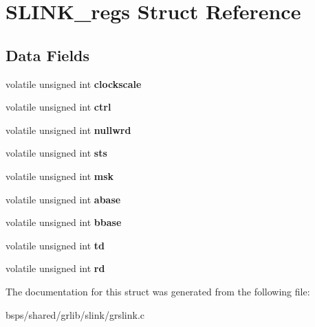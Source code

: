 \hypertarget{structSLINK__regs}{}\section{S\+L\+I\+N\+K\+\_\+regs Struct Reference}
\label{structSLINK__regs}
\subsection*{Data Fields}
\begin{DoxyCompactItemize}
\item 
\mbox{\label{structSLINK__regs_af1700762f8d6846b135bd1be9c862d0a}} 
volatile unsigned int {\bfseries clockscale}
\item 
\mbox{\label{structSLINK__regs_affdf6dc5f4cced5d19d4d3ce6911e9f4}} 
volatile unsigned int {\bfseries ctrl}
\item 
\mbox{\label{structSLINK__regs_a635ea81b634202725db33be83a520710}} 
volatile unsigned int {\bfseries nullwrd}
\item 
\mbox{\label{structSLINK__regs_add5872111d9b0443b979039c509c9cf8}} 
volatile unsigned int {\bfseries sts}
\item 
\mbox{\label{structSLINK__regs_ae880ad93f16c65f2ec1cd17b8d6faa06}} 
volatile unsigned int {\bfseries msk}
\item 
\mbox{\label{structSLINK__regs_a14927425018cdf2c0faba05c86b45399}} 
volatile unsigned int {\bfseries abase}
\item 
\mbox{\label{structSLINK__regs_ad8280b3a9732cfe3c04f0dde0329f2d5}} 
volatile unsigned int {\bfseries bbase}
\item 
\mbox{\label{structSLINK__regs_a99f8b0cc7089e1854e14db6837c478d7}} 
volatile unsigned int {\bfseries td}
\item 
\mbox{\label{structSLINK__regs_a22ea2ad3e80a16673b4dffd8df7d3b68}} 
volatile unsigned int {\bfseries rd}
\end{DoxyCompactItemize}


The documentation for this struct was generated from the following file\+:\begin{DoxyCompactItemize}
\item 
bsps/shared/grlib/slink/grslink.\+c\end{DoxyCompactItemize}
